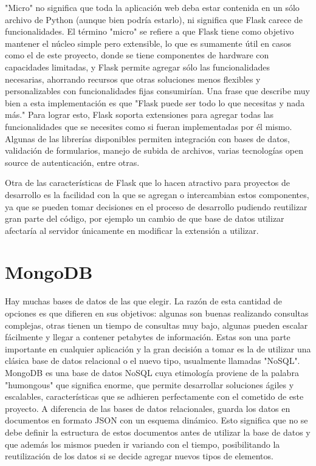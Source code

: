 "Micro" no significa que toda la aplicación web deba estar contenida en un sólo archivo de Python (aunque bien podría estarlo), ni significa que Flask carece de funcionalidades. El término "micro" se refiere a que Flask tiene como objetivo mantener el núcleo simple pero extensible, lo que es sumamente útil en casos como el de este proyecto, donde se tiene componentes de hardware con capacidades limitadas, y Flask permite agregar sólo las funcionalidades necesarias, ahorrando recursos que otras soluciones menos flexibles y personalizables con funcionalidades fijas consumirían.
Una frase que describe muy bien a esta implementación es que "Flask puede ser todo lo que necesitas y nada más." 
Para lograr esto, Flask soporta extensiones para agregar todas las funcionalidades que se necesites como si fueran implementadas por él mismo. Algunas de las librerías disponibles permiten integración con bases de datos, validación de formularios, manejo de subida de archivos, varias tecnologías open source de autenticación, entre otras.

Otra de las características de Flask que lo hacen atractivo para proyectos de desarrollo es la facilidad con la que se agregan o intercambian estos componentes, ya que se pueden tomar decisiones en el proceso de desarrollo pudiendo reutilizar gran parte del código, por ejemplo un cambio de que base de datos utilizar afectaría al servidor únicamente en modificar la extensión a utilizar.

\section{MongoDB}
Hay muchas bases de datos de las que elegir. La razón de esta cantidad de opciones es que difieren en sus objetivos: algunas son buenas realizando consultas complejas, otras tienen un tiempo de consultas muy bajo, algunas pueden escalar fácilmente y llegar a contener petabytes de información.
Estas son una parte importante en cualquier aplicación y la gran decisión a tomar es la de utilizar una clásica base de datos relacional o el nuevo tipo, usualmente llamadas "NoSQL".
MongoDB es una base de datos NoSQL cuya etimología proviene de la palabra "humongous" que significa enorme, que permite desarrollar soluciones ágiles y escalables, características que se adhieren perfectamente con el cometido de este proyecto.
A diferencia de las bases de datos relacionales, guarda los datos en documentos en formato JSON con un esquema dinámico. 
Esto significa que no se debe definir la estructura de estos documentos antes de utilizar la base de datos y que además los mismos pueden ir variando con el tiempo, posibilitando la reutilización de los datos si se decide agregar nuevos tipos de elementos.

